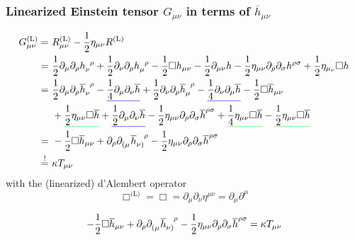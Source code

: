 \subsubsection{Linearized Einstein tensor \texorpdfstring{$G_{\mu\nu}$}{Gmunu} in terms of \texorpdfstring{$\overline{h}_{\mu\nu}$}{hbarmunu}}

\begin{equation}
    \begin{split}
        G_{\mu\nu}^{\text{(L)}} =\ & R_{\mu\nu}^{\text{(L)}} - \frac{1}{2} \eta_{\mu\nu} R^{\text{(L)}} \\
        =\ & \frac{1}{2} \partial_\mu \partial_\rho \tensor{h}{_\nu^\rho} + \frac{1}{2} \partial_\nu \partial_\rho \tensor{h}{_\mu^\rho}
        - \frac{1}{2} \Box h_{\mu\nu} - \frac{1}{2} \partial_{\mu\nu}h-\frac{1}{2} \eta_{\mu\nu}\partial_\rho\partial_\sigma h^{\rho\sigma}
        + \frac{1}{2} \eta_{\mu_\nu}\Box h \\
        =\ & \frac{1}{2} \partial_\mu\partial_\rho \tensor{\overline{h}}{_\nu^\rho}
        - \mathunderline{blue}{\frac{1}{4}\partial_\mu\partial_\nu\overline{h}}
        + \frac{1}{2} \partial_\nu\partial_\rho\tensor{\overline{h}}{_\mu^\rho}
        - \mathunderline{blue}{\frac{1}{4}\partial_\nu\partial_\mu\overline{h}} - \frac{1}{2}\Box\overline{h}_{\mu\nu} \\
        & + \mathunderline{green}{\frac{1}{2}\eta_{\mu\nu}\Box\overline{h}} + \mathunderline{blue}{\frac{1}{2}\partial_\mu\partial_\nu\overline{h}}
        - \frac{1}{2}\eta_{\mu\nu}\partial_\rho\partial_\sigma\overline{h}^{\rho\sigma}
        + \mathunderline{green}{\frac{1}{4}\eta_{\mu\nu}\Box\overline{h}} - \mathunderline{green}{\frac{1}{2}\eta_{\mu\nu}\Box\overline{h}} \\
        =\ & -\frac{1}{2} \Box \overline{h}_{\mu\nu} + \partial_\rho \tensor{\partial}{_(_\mu}\tensor{\overline{h}}{_\nu_)^\rho}
        - \frac{1}{2} \eta_{\mu\nu}\partial_\rho\partial_\sigma \overline{h}^{\rho\sigma} \\
        \overset{!}{=}\ & \kappa T_{\mu\nu}
    \end{split}
\end{equation} %
with the (linearized) d'Alembert operator
\begin{equation}
    \Box^{\text{(L)}} = \Box = \partial_\mu\partial_\nu \eta^{\mu\nu}=\partial_\mu\partial^\mu
\end{equation}
\begin{definition}
    \begin{equation}
        \label{eq:lineinsteineqs}
        -\frac{1}{2} \Box \overline{h}_{\mu\nu} + \partial_\rho \tensor{\partial}{_(_\mu}\tensor{\overline{h}}{_\nu_)^\rho}
        - \frac{1}{2} \eta_{\mu\nu}\partial_\rho\partial_\sigma \overline{h}^{\rho\sigma} = \kappa T_{\mu\nu}
    \end{equation}
\end{definition}

